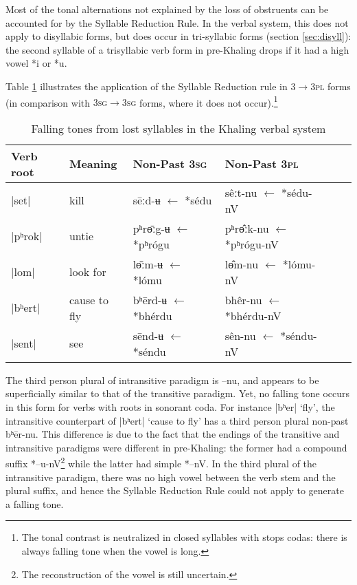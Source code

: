 \documentclass[oldfontcommands,oneside,a4paper,11pt]{article}
\newcommand{\ipa}[1]{{\phon \mbox{#1}}} %
\begin{document}

Most of the tonal alternations not explained by the loss of obstruents can be accounted for by the  Syllable Reduction Rule. In the verbal system, this does not apply to disyllabic forms, but does  occur in tri-syllabic forms (section \ref{sec:disyll}): the second syllable of a trisyllabic verb form in pre-Khaling drops if it had a high vowel \ipa{*i} or \ipa{*u}.

Table  \ref{tab:falling.verb2} illustrates the application of the Syllable Reduction rule in \textsc{3$\rightarrow$3pl} forms (in comparison with \textsc{3sg$\rightarrow$3sg} forms, where it does not occur).\footnote{The tonal contrast is neutralized  in closed syllables with stops codas: there is always falling tone when the vowel is long. }
 
\begin{table}[H] 
\caption{Falling tones from lost syllables in the Khaling verbal system} \centering  \label{tab:falling.verb2} 
\begin{tabular}{llllll} 
\toprule 
Verb root	&Meaning	&Non-Past \textsc{3sg} & Non-Past \textsc{3pl} & \\ 
\midrule 
|set|	&	kill			&\ipa{sēːd-ʉ} $\leftarrow$ \ipa{*sédu} &\ipa{sêːt-nu} $\leftarrow$ \ipa{*sédu-nV} \\ 
|pʰrok|	&	untie		&\ipa{pʰrɵ̄ːg-ʉ} $\leftarrow$ \ipa{*pʰrógu} &\ipa{pʰrɵ̂ːk-nu} $\leftarrow$  \ipa{*pʰrógu-nV} \\
|lom|	&	look for		&\ipa{lɵ̄ːm-ʉ} $\leftarrow$ \ipa{*lómu} &\ipa{lɵ̂m-nu} $\leftarrow$ \ipa{*lómu-nV} \\ 
\midrule
|bʰert|	&	cause to fly			&\ipa{bʰērd-ʉ} $\leftarrow$ \ipa{*bhérdu}&\ipa{bhêr-nu} $\leftarrow$ \ipa{*bhérdu-nV} \\ 
|sent|	&	see			&\ipa{sēnd-ʉ} $\leftarrow$ \ipa{*séndu} &\ipa{sên-nu} $\leftarrow$ \ipa{*séndu-nV} \\ 
\bottomrule 
\end{tabular} 
\end{table} 
The  third person plural of intransitive paradigm is \ipa{--nu}, and appears to be superficially similar to that of the transitive paradigm. Yet,  no falling tone occurs in this form for verbs with roots in sonorant coda. For instance |bʰer| `fly', the intransitive counterpart of |bʰert|	`cause to fly' has a third person plural non-past \ipa{bʰēr-nu}. This difference is due to the fact that the endings of the transitive and  intransitive paradigms were different in pre-Khaling: the former had a compound suffix \ipa{*--u-nV}\footnote{The reconstruction of the vowel    is still uncertain.} while the latter had simple \ipa{*--nV}. In the third plural of the intransitive paradigm, there was no high vowel between the verb stem and the plural suffix, and hence the Syllable Reduction Rule could not apply to generate a falling tone.
\end{document}
